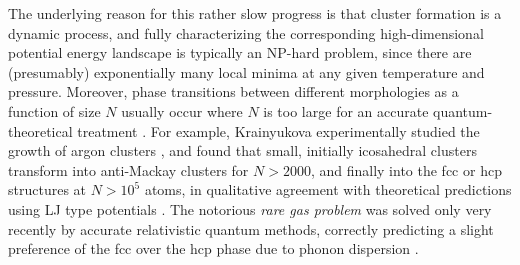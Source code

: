The underlying reason for this rather slow progress is that cluster formation
is a dynamic process, and fully characterizing the corresponding
high-dimensional potential energy landscape is typically an NP-hard problem,
since there are (presumably) exponentially many local minima at any given
temperature and pressure\autocite{Stillinger_Packingstructurestransitions_1984,
Oganov-2006, Massen_Powerlawdistributionsareas_2007, wales10, Oganov-2011,
calvo12, Wales-2015}.  Moreover, phase transitions between different
morphologies as a function of size $N$ usually occur where $N$ is too large for
an accurate quantum-theoretical treatment \autocite{Waal89,
Cleveland_energeticsstructurenickel_1991, vandewaal96a, Doye-1995,
vandeWaalTd00}.  For example, Krainyukova experimentally studied the growth of
argon clusters \autocite{Krainyukova-2012}, and found that small, initially
icosahedral clusters transform into anti-Mackay clusters for $N>2000$, and
finally into the \ac{fcc} or hcp structures at $N>10^5$ atoms, in
qualitative agreement with theoretical predictions using \ac{LJ} type
potentials \autocite{Martin-1996,
Schwerdtfeger_ExtensionLennardJonespotential_2006, Krainyukova-2007}.  The
notorious \textit{ rare gas problem} was solved only very recently by accurate
relativistic quantum methods, correctly predicting a slight preference of the
\ac{fcc} over the hcp phase due to phonon dispersion \autocite{Schwerdtfeger-2016}.

